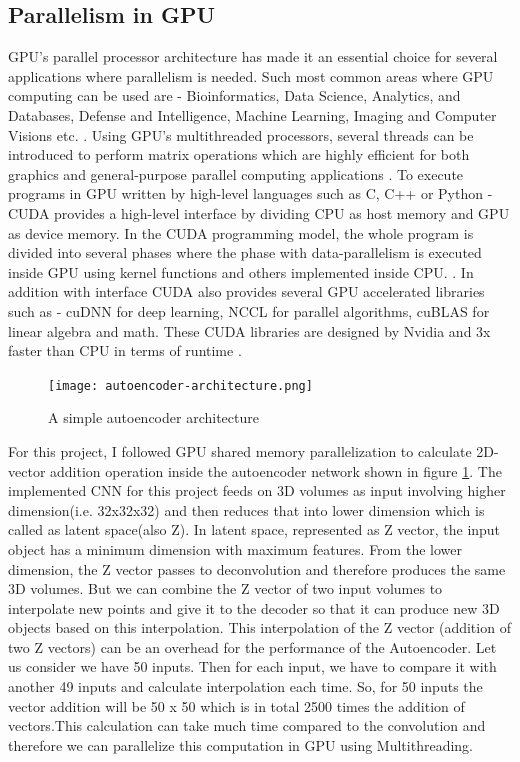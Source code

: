 \documentclass[11pt]{article}       %
\begin{document}
\subsection{Parallelism in GPU} \label{subrev3}
GPU's parallel processor architecture has made it an essential choice for several applications where parallelism is needed. Such most common areas where GPU computing can be used are - Bioinformatics, Data Science, Analytics, and Databases, Defense and Intelligence, Machine Learning, Imaging and Computer Visions etc. \cite{samel2016gpu}. Using GPU's multithreaded processors, several threads can be introduced to perform matrix operations which are highly efficient for both graphics and general-purpose parallel computing applications \cite{nickolls2008scalable}. To execute programs in GPU written by high-level languages such as C, C++ or Python - CUDA provides a high-level interface by dividing CPU as host memory and GPU as device memory. In the CUDA programming model, the whole program is divided into several phases where the phase with data-parallelism is executed inside GPU using kernel functions and others implemented inside CPU. \cite{ryoo2008optimization}. In addition with interface CUDA also provides several GPU accelerated libraries such as - cuDNN for deep learning, NCCL for parallel algorithms, cuBLAS for linear algebra and math. These CUDA libraries are designed by Nvidia and 3x faster than CPU in terms of runtime \cite{mis2}. \newline
\begin{figure}[h]
\begin{center}
\texttt{[image: autoencoder-architecture.png]}
\caption{A simple autoencoder architecture}\cite{mis4} \label{autoencoder}
\end{center}
\end{figure}
For this project, I followed GPU shared memory parallelization to calculate 2D-vector addition operation inside the autoencoder network shown in figure \ref{autoencoder}. The implemented CNN for this project feeds on 3D volumes as input involving higher dimension(i.e. 32x32x32) and then reduces that into lower dimension \cite{dr8} which is called as latent space(also Z). In latent space, represented as Z vector, the input object has a minimum dimension with maximum features. From the lower dimension, the Z vector passes to deconvolution and therefore produces the same 3D volumes. But we can combine the Z vector of two input volumes to interpolate new points and give it to the decoder so that it can produce new 3D objects based on this interpolation. This interpolation of the Z vector (addition of two Z vectors) can be an overhead for the performance of the Autoencoder. Let us consider we have 50 inputs. Then for each input, we have to compare it with another 49 inputs and calculate interpolation each time. So, for 50 inputs the vector addition will be 50 x 50 which is in total 2500 times the addition of vectors.This calculation can take much time compared to the convolution and therefore we can parallelize this computation in GPU using Multithreading.\newline
\end{document}
